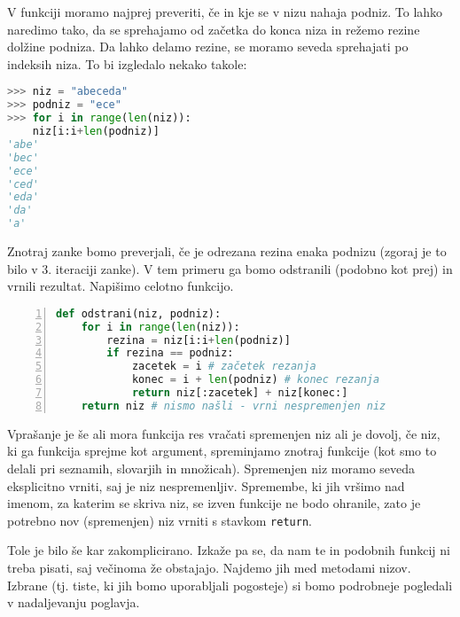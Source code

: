 \begin{resitev}
V funkciji moramo najprej preveriti, če in kje se v nizu nahaja podniz. To lahko naredimo tako, da se sprehajamo od začetka do konca niza in režemo rezine dolžine podniza. Da lahko delamo rezine, se moramo seveda sprehajati po indeksih niza. To bi izgledalo nekako takole:
\begin{lstlisting}[language=Python]
>>> niz = "abeceda"
>>> podniz = "ece"
>>> for i in range(len(niz)):
	niz[i:i+len(podniz)]
'abe'
'bec'
'ece'
'ced'
'eda'
'da'
'a'
\end{lstlisting}
Znotraj zanke bomo preverjali, če je odrezana rezina enaka podnizu (zgoraj je to bilo v 3. iteraciji zanke). V tem primeru ga bomo odstranili (podobno kot prej) in vrnili rezultat. Napišimo celotno funkcijo.
\begin{lstlisting}[language=Python,numbers=left]
def odstrani(niz, podniz):
    for i in range(len(niz)):
        rezina = niz[i:i+len(podniz)]
        if rezina == podniz:
            zacetek = i # začetek rezanja
            konec = i + len(podniz) # konec rezanja
            return niz[:zacetek] + niz[konec:]
    return niz # nismo našli - vrni nespremenjen niz
\end{lstlisting}
Vprašanje je še ali mora funkcija res vračati spremenjen niz ali je dovolj, če niz, ki ga funkcija sprejme kot argument, spreminjamo znotraj funkcije (kot smo to delali pri seznamih, slovarjih in množicah). Spremenjen niz moramo seveda eksplicitno vrniti, saj je niz nespremenljiv. Spremembe, ki jih vršimo nad imenom, za katerim se skriva niz, se izven funkcije ne bodo ohranile, zato je potrebno nov (spremenjen) niz vrniti s stavkom \texttt{return}. 
\end{resitev}

Tole je bilo še kar zakomplicirano. Izkaže pa se, da nam te in podobnih funkcij ni treba pisati, saj večinoma že obstajajo. Najdemo jih med metodami nizov. Izbrane (tj. tiste, ki jih bomo uporabljali pogosteje) si bomo podrobneje pogledali v nadaljevanju poglavja.

